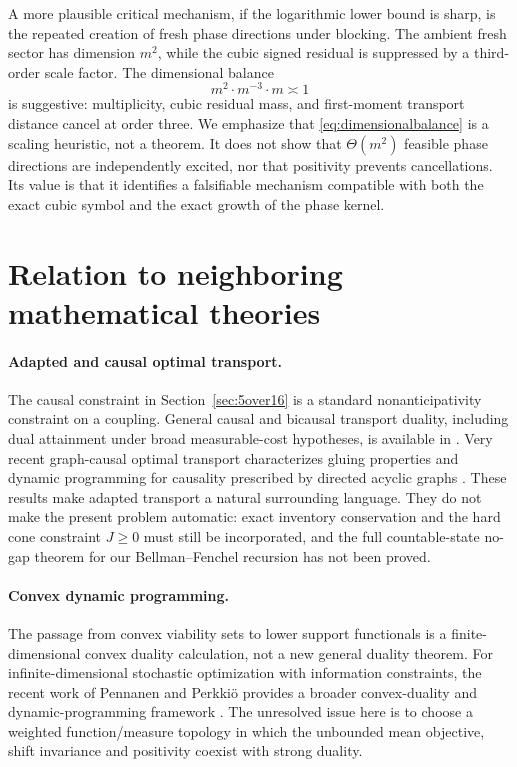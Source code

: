 \documentclass[11pt,a4paper]{article}
\theoremstyle{definition}
\theoremstyle{remark}
\begin{document}
A more plausible critical mechanism, if the logarithmic lower bound is sharp,
is the repeated creation of fresh phase directions under blocking.  The
ambient fresh sector has dimension $m^2$, while the cubic signed residual is
suppressed by a third-order scale factor.  The dimensional balance
\begin{equation}
 m^2\cdot m^{-3}\cdot m\asymp1
 \label{eq:dimensionalbalance}
\end{equation}
is suggestive: multiplicity, cubic residual mass, and first-moment transport
distance cancel at order three.  We emphasize that
\eqref{eq:dimensionalbalance} is a scaling heuristic, not a theorem.  It does
not show that $\Theta(m^2)$ feasible phase directions are independently
excited, nor that positivity prevents cancellations.  Its value is that it
identifies a falsifiable mechanism compatible with both the exact cubic symbol
and the exact growth of the phase kernel.

\section{Relation to neighboring mathematical theories}
\label{sec:neighbors}

\paragraph{Adapted and causal optimal transport.}
The causal constraint in Section~\ref{sec:5over16} is a standard
nonanticipativity constraint on a coupling.  General causal and bicausal
transport duality, including dual attainment under broad measurable-cost
hypotheses, is available in \cite{KrsekPammer2025}.  Very recent graph-causal
optimal transport characterizes gluing properties and dynamic programming for
causality prescribed by directed acyclic graphs \cite{OblojTuchilus2026}.
These results make adapted transport a natural surrounding language.  They do
not make the present problem automatic: exact inventory conservation and the
hard cone constraint $J\ge0$ must still be incorporated, and the full
countable-state no-gap theorem for our Bellman--Fenchel recursion has not been
proved.

\paragraph{Convex dynamic programming.}
The passage from convex viability sets to lower support functionals is a
finite-dimensional convex duality calculation, not a new general duality
theorem.  For infinite-dimensional stochastic optimization with information
constraints, the recent work of Pennanen and Perkki\"o provides a broader
convex-duality and dynamic-programming framework \cite{PennanenPerkkio2026Dual,PennanenPerkkio2026DP}.
The unresolved issue here is to choose a weighted function/measure topology in
which the unbounded mean objective, shift invariance and positivity coexist
with strong duality.
\end{document}

